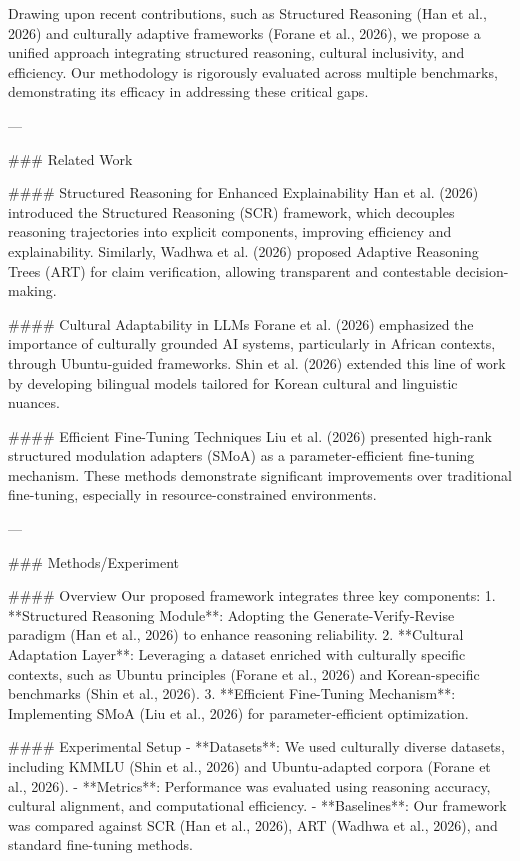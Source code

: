 Drawing upon recent contributions, such as Structured Reasoning (Han et al., 2026) and culturally adaptive frameworks (Forane et al., 2026), we propose a unified approach integrating structured reasoning, cultural inclusivity, and efficiency. Our methodology is rigorously evaluated across multiple benchmarks, demonstrating its efficacy in addressing these critical gaps.

---

### Related Work

#### Structured Reasoning for Enhanced Explainability
Han et al. (2026) introduced the Structured Reasoning (SCR) framework, which decouples reasoning trajectories into explicit components, improving efficiency and explainability. Similarly, Wadhwa et al. (2026) proposed Adaptive Reasoning Trees (ART) for claim verification, allowing transparent and contestable decision-making.

#### Cultural Adaptability in LLMs
Forane et al. (2026) emphasized the importance of culturally grounded AI systems, particularly in African contexts, through Ubuntu-guided frameworks. Shin et al. (2026) extended this line of work by developing bilingual models tailored for Korean cultural and linguistic nuances.

#### Efficient Fine-Tuning Techniques
Liu et al. (2026) presented high-rank structured modulation adapters (SMoA) as a parameter-efficient fine-tuning mechanism. These methods demonstrate significant improvements over traditional fine-tuning, especially in resource-constrained environments.

---

### Methods/Experiment

#### Overview
Our proposed framework integrates three key components:
1. **Structured Reasoning Module**: Adopting the Generate-Verify-Revise paradigm (Han et al., 2026) to enhance reasoning reliability.
2. **Cultural Adaptation Layer**: Leveraging a dataset enriched with culturally specific contexts, such as Ubuntu principles (Forane et al., 2026) and Korean-specific benchmarks (Shin et al., 2026).
3. **Efficient Fine-Tuning Mechanism**: Implementing SMoA (Liu et al., 2026) for parameter-efficient optimization.

#### Experimental Setup
- **Datasets**: We used culturally diverse datasets, including KMMLU (Shin et al., 2026) and Ubuntu-adapted corpora (Forane et al., 2026).
- **Metrics**: Performance was evaluated using reasoning accuracy, cultural alignment, and computational efficiency.
- **Baselines**: Our framework was compared against SCR (Han et al., 2026), ART (Wadhwa et al., 2026), and standard fine-tuning methods.

